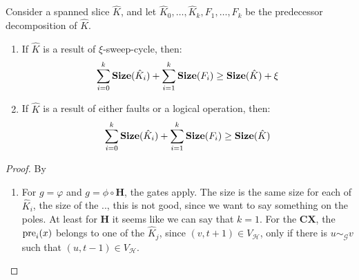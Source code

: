  \begin{corollary}
    Consider a spanned slice $\hat{K}$, and let $\hat{K}_{0}, \ldots, \hat{K}_{k}, F_{1}, \ldots, F_{k}$ be the predecessor decomposition of $\hat{K}$. 
    \begin{enumerate}
      \item If $\hat{K}$ is a result of $\xi$-sweep-cycle, then: 
        \begin{equation*}
          \begin{split}
            \sum_{i=0}^{k}\mathbf{Size}(\hat{K}_{i}) +  \sum^{k}_{i=1}\mathbf{Size}(F_{i}) \ge \mathbf{Size}(\hat{K}) + \xi
          \end{split}
        \end{equation*}
          \item If $\hat{K}$ is a result of either faults or a logical operation, then: 
        \begin{equation*}
          \begin{split}
            \sum_{i=0}^{k}\mathbf{Size}(\hat{K}_{i}) +  \sum^{k}_{i=1}\mathbf{Size}(F_{i}) \ge \mathbf{Size}(\hat{K})  
          \end{split}
        \end{equation*}
      \end{enumerate}
  \end{corollary}
  \begin{proof}
    By 
    \begin{enumerate}
      \item For $g = \varphi$ and $g = \phi \circ \mathbf{H}$, the gates apply. The size is the same size for each of $\hat{K}_{i}$, the size of the .., this is not good, since we want to say something on the poles. At least for $\mathbf{H}$ it seems like we can say that $k=1$. For the $\mathbf{CX}$, the $\text{pre}_{i}(x)$ belongs to one of the $\hat{K}_{j}$, since $ (v,t+1) \in V_{\mathcal{H}}$, only if there is $u \sim_{\mathcal{G}} v$ such that $(u,t-1) \in V_{\mathcal{H}}$. 
    \end{enumerate}
  \end{proof}

